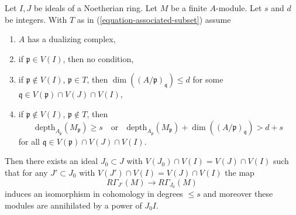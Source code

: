 %
\begin{lemma}
\label{lemma-kill-colimit-weak-general}
Let $I, J$ be ideals of a Noetherian ring. Let $M$ be a finite $A$-module.
Let $s$ and $d$ be integers. With $T$ as in
(\ref{equation-associated-subset}) assume
\begin{enumerate}
\item $A$ has a dualizing complex,
\item if $\mathfrak p \in V(I)$, then no condition,
\item if $\mathfrak p \not \in V(I)$, $\mathfrak p \in T$, then
$\dim((A/\mathfrak p)_\mathfrak q) \leq d$ for some
$\mathfrak q \in V(\mathfrak p) \cap V(J) \cap V(I)$,
\item if $\mathfrak p \not \in V(I)$, $\mathfrak p \not \in T$, then
$$
\text{depth}_{A_\mathfrak p}(M_\mathfrak p) \geq s
\quad\text{or}\quad
\text{depth}_{A_\mathfrak p}(M_\mathfrak p) +
\dim((A/\mathfrak p)_\mathfrak q) > d + s
$$
for all $\mathfrak q \in V(\mathfrak p) \cap V(J) \cap V(I)$.
\end{enumerate}
Then there exists an ideal $J_0 \subset J$ with
$V(J_0) \cap V(I) = V(J) \cap V(I)$ such that for any $J' \subset J_0$ with
$V(J') \cap V(I) = V(J) \cap V(I)$ the map
$$
R\Gamma_{J'}(M) \longrightarrow R\Gamma_{J_0}(M)
$$
induces an isomorphism in cohomology in degrees $\leq s$
and moreover these modules are annihilated by a power of $J_0I$.
\end{lemma}

